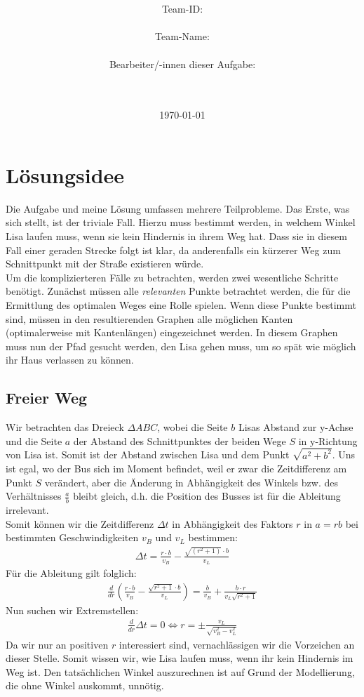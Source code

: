 \documentclass[a4paper,10pt,ngerman]{scrartcl}
\title{\textbf{\Huge\Aufgabe}}
\author{\LARGE Team-ID: \LARGE \TeamID \\\\
	    \LARGE Team-Name: \LARGE \TeamName \\\\
	    \LARGE Bearbeiter/-innen dieser Aufgabe: \\ 
	    \LARGE \Namen\\\\}
\date{\LARGE\today}
\begin{document}
\maketitle
\tableofcontents

\vspace{0.5cm}

\section{Lösungsidee}
Die Aufgabe und meine Lösung umfassen mehrere Teilprobleme. Das Erste, was sich stellt, ist der triviale Fall. Hierzu muss bestimmt werden, in welchem Winkel Lisa laufen muss, wenn sie kein Hindernis in ihrem Weg hat. Dass sie in diesem Fall einer geraden Strecke folgt ist klar, da anderenfalls ein kürzerer Weg zum Schnittpunkt mit der Stra\ss e existieren würde.\\
\indent Um die komplizierteren Fälle zu betrachten, werden zwei wesentliche Schritte benötigt. Zunächst müssen alle \emph{relevanten} Punkte betrachtet werden, die für die Ermittlung des optimalen Weges eine Rolle spielen. Wenn diese Punkte bestimmt sind, müssen in den resultierenden Graphen alle möglichen Kanten (optimalerweise mit Kantenlängen) eingezeichnet werden. In diesem Graphen muss nun der Pfad gesucht werden, den Lisa gehen muss, um so spät wie möglich ihr Haus verlassen zu können.
\subsection{Freier Weg}
Wir betrachten das Dreieck $\Delta ABC$, wobei die Seite $b$ Lisas Abstand zur y-Achse und die Seite $a$ der Abstand des Schnittpunktes der beiden Wege $S$ in y-Richtung von Lisa ist. Somit ist der Abstand zwischen Lisa und dem Punkt $\sqrt{a^2 + b^2}$. Uns ist egal, wo der Bus sich im Moment befindet, weil er zwar die Zeitdifferenz am Punkt $S$ verändert, aber die Änderung in Abhängigkeit des Winkels bzw. des Verhältnisses $\frac{a}{b}$ bleibt gleich, d.h. die Position des Busses ist für die Ableitung irrelevant.\\
Somit können wir die Zeitdifferenz $\Delta t$ in Abhängigkeit des Faktors $r$ in $a=rb$ bei bestimmten Geschwindigkeiten $v_B$ und $v_L$ bestimmen:
\begin{align}
\Delta t = \frac{r\cdot b}{v_B} - \frac{\sqrt{(r^2+1)}\cdot b }{v_L}
\end{align}
Für die Ableitung gilt folglich:
\begin{align}
\frac{d}{dr}\left(\frac{r\cdot b}{v_B} - \frac{\sqrt{r^2+1}\cdot b }{v_L}\right)= \frac{b}{v_B} + \frac{b\cdot r }{v_L\sqrt{r^2+1}}
\end{align}
Nun suchen wir Extremstellen:
\begin{align}
\frac{d}{dr}\Delta t = 0 \Leftrightarrow r = \pm\frac{v_L}{\sqrt{v_B^2 - v_L^2}}
\end{align}
Da wir nur an positiven $r$ interessiert sind, vernachlässigen wir die Vorzeichen an dieser Stelle. Somit wissen wir, wie Lisa laufen muss, wenn ihr kein Hindernis im Weg ist. Den tatsächlichen Winkel auszurechnen ist auf Grund der Modellierung, die ohne Winkel auskommt, unnötig.
\end{document}
